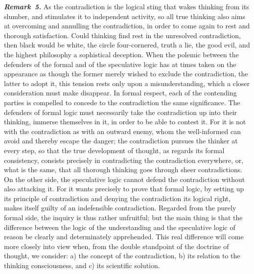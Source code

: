 \documentclass[12pt]{book}
\newcommand{\anm}[1]{\emph{\textbf{Remark~#1.}}}
\begin{document}
\anm{5} As the contradiction is the logical sting that wakes thinking from
its slumber, and stimulates it to independent activity, so all true thinking
also aims at overcoming and annulling the contradiction, in order to come
again to rest and thorough satisfaction. Could thinking find rest in the
unresolved contradiction, then black would be white, the circle
four-cornered, truth a lie, the good evil, and the highest philosophy a
sophistical deception. When the polemic between the defenders of the formal
and of the speculative logic has at times taken on the appearance as though
the former merely wished to exclude the contradiction, the latter to adopt
it, this tension rests only upon a misunderstanding, which a closer
consideration must make disappear. In formal respect, each of the contending
parties is compelled to concede to the contradiction the same significance.
The defenders of formal logic must necessarily take the contradiction up
into their thinking, immerse themselves in it, in order to be able to
contest it. For it is not with the contradiction as with an outward enemy,
whom the well-informed can avoid and thereby escape the danger; the
contradiction pursues the thinker at every step, so that the true
development of thought, as regards its formal consistency, consists
precisely in contradicting the contradiction everywhere, or, what is the
same, that all thorough thinking goes through sheer contradictions. On the
other side, the speculative logic cannot defend the contradiction without
also attacking it. For it wants precisely to prove that formal logic, by
setting up its principle of contradiction and denying the contradiction its
logical right, makes itself guilty of an indefensible contradiction.
Regarded from the purely formal side, the inquiry is thus rather unfruitful;
but the main thing is that the difference between the logic of the
understanding and the speculative logic of reason be clearly and
determinately apprehended. This real difference will come more closely into
view when, from the double standpoint of the doctrine of thought, we
consider: a) the concept of the contradiction, b) its relation to the
thinking consciousness, and c) its scientific solution.
\end{document}
